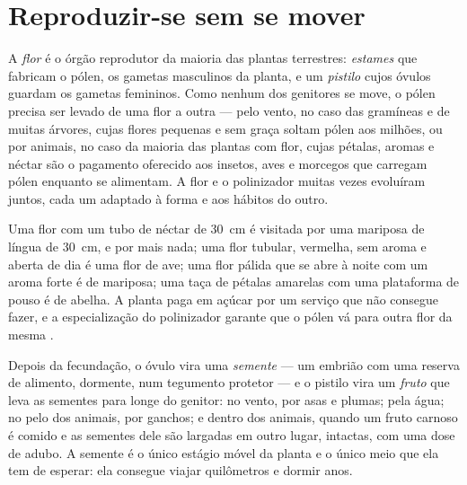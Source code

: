 \section{Reproduzir-se sem se mover}

\begin{proposition}\label{prop:g12:plant-rooted-life:flowers}
A \emph{flor} é o órgão reprodutor da maioria das plantas terrestres:
\emph{estames} que fabricam o pólen, os gametas masculinos da planta, e
um \emph{pistilo} cujos óvulos guardam os gametas femininos. Como
nenhum dos genitores se move, o pólen precisa ser levado de uma flor a
outra --- pelo vento, no caso das gramíneas e de muitas árvores, cujas
flores pequenas e sem graça soltam pólen aos milhões, ou por animais,
no caso da maioria das plantas com flor, cujas pétalas, aromas e néctar
são o pagamento oferecido aos insetos, aves e morcegos que carregam
pólen enquanto se alimentam. A flor e o polinizador muitas vezes
evoluíram juntos, cada um adaptado à forma e aos hábitos do outro.
\end{proposition}
\admitted

\begin{example}\label{ex:g12:plant-rooted-life:match}
Uma flor com um tubo de néctar de \qty{30}{cm} é visitada por uma
mariposa de língua de \qty{30}{cm}, e por mais nada; uma flor tubular,
vermelha, sem aroma e aberta de dia é uma flor de ave; uma flor pálida
que se abre à noite com um aroma forte é de mariposa; uma taça de
pétalas amarelas com uma plataforma de pouso é de abelha. A planta paga
em açúcar por um serviço que não consegue fazer, e a especialização do
polinizador garante que o pólen vá para outra flor da mesma .
\end{example}

\begin{proposition}\label{prop:g12:plant-rooted-life:dispersal}
Depois da fecundação, o óvulo vira uma \emph{semente} --- um embrião
com uma reserva de alimento, dormente, num tegumento protetor --- e o
pistilo vira um \emph{fruto} que leva as sementes para longe do
genitor: no vento, por asas e plumas; pela água; no pelo dos animais,
por ganchos; e dentro dos animais, quando um fruto carnoso é comido e
as sementes dele são largadas em outro lugar, intactas, com uma dose de
adubo. A semente é o único estágio móvel da planta e o único meio que
ela tem de esperar: ela consegue viajar quilômetros e dormir anos.
\end{proposition}
\admitted

